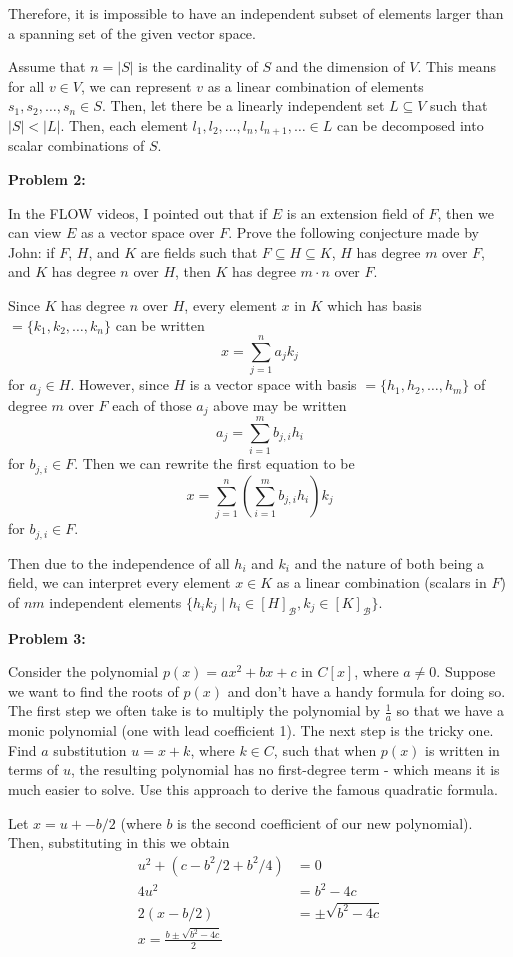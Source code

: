 \documentclass[letter paper, 12pt]{article}
\begin{document}
    Therefore, it is impossible to have an independent subset of elements larger than a spanning set of the given vector space.
    
    
    Assume that $n=\lvert S\rvert$ is the cardinality of $S$ and the dimension of $V$. This means for all $v\in V$, we can represent $v$ as a linear combination of elements $s_1,s_2,\dots,s_n \in S$. Then, let there be a linearly independent set $L \subseteq V$ such that $\lvert S\rvert < \lvert L\rvert$. Then, each element $l_1,l_2,\dots,l_n,l_{n+1},\dots\in L$ can be decomposed into scalar combinations of $S$.
    
\noindent\textbf{Problem 2:}
    
    In the FLOW videos, I pointed out that if $E$ is an extension field of $F$, then we can view $E$ as a vector space over $F$. Prove the following conjecture made by John: if $F$, $H$, and $K$ are fields such that $F \subseteq H \subseteq K$, $H$ has degree $m$ over $F$, and $K$ has degree $n$ over $H$, then $K$ has degree $m\cdot n$ over $F$.
    
    Since $K$ has degree $n$ over $H$, every element $x$ in $K$ which has basis $= \{k_1, k_2, \dots, k_n\}$  can be written $$x = \sum_{j=1}^na_{j}k_j$$ for $a_{j}\in H$. However, since $H$ is a vector space with basis $=\{h_1, h_2, \dots, h_m \}$ of degree $m$ over $F$ each of those $a_{j}$ above may be written $$a_{j} = \sum_{i=1}^mb_{j,i}h_i$$ for $b_{j,i}\in F$. Then we can rewrite the first equation to be $$x = \sum_{j=1}^n\left(\sum_{i=1}^mb_{j,i}h_i\right)k_j$$ for $b_{j,i}\in F$.
    
    Then due to the independence of all $h_i$ and $k_i$ and the nature of both being a field, we can interpret every element $x\in K$ as a linear combination (scalars in $F$) of $nm$ independent elements $\{h_ik_j \mid h_i\in [H]_\mathcal{B},k_j\in [K]_\mathcal{B}\}$.
    
\noindent\textbf{Problem 3:}
    
    Consider the polynomial $p(x) = ax^2 + bx + c$ in $C[x]$, where $a\not= 0$. Suppose we want to find the roots of $p(x)$ and don't have a handy formula for doing so. The first step we often take is to multiply the polynomial by $\frac{1}{a}$ so that we have a monic polynomial (one with lead coefficient 1). The next step is the tricky one. Find $a$ substitution $u = x + k$, where $k \in C$, such that when $p(x)$ is written in terms of $u$, the resulting polynomial has no first-degree term - which means it is much easier to solve. Use this approach to derive the famous quadratic formula.
    
    Let $x = u + -b/2$ (where $b$ is the second coefficient of our new polynomial). Then, substituting in this we obtain 
    \begin{align*}
        u^2+(c-b^2/2+b^2/4) &= 0\\
        4u^2 &= b^2 - 4c\\
        2(x-b/2) &= \pm\sqrt{b^2-4c}\\
        x = \frac{b\pm\sqrt{b^2-4c}}{2}
    \end{align*}
    
    
\end{document}
